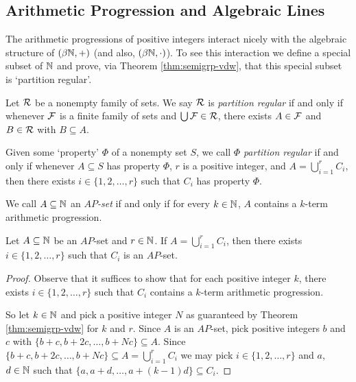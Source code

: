 \subsection{Arithmetic Progression and Algebraic Lines}
The arithmetic progressions of positive integers interact nicely with the algebraic structure of $(\beta \mathbb{N}, +)$ (and also, $(\beta \mathbb{N}, \cdot)$). 
To see this interaction we define a special subset of $\mathbb{N}$ and prove, via Theorem \ref{thm:semigrp-vdw}, that this special subset is `partition regular'.%

\begin{defn}
  Let $\mathcal{R}$ be a nonempty family of sets.
  We say $\mathcal{R}$ is \emph{partition regular} if and only if whenever $\mathcal{F}$ is a finite family of sets and $\bigcup \mathcal{F} \in \mathcal{R}$, there exists $A \in \mathcal{F}$ and $B \in \mathcal{R}$ with $B \subseteq A$.
\end{defn}
\begin{rmk}
  Given some `property' $\Phi$ of a nonempty set $S$, we call $\Phi$ \emph{partition regular} if and only if whenever $A \subseteq S$ has property $\Phi$, $r$ is a positive integer, and $A = \bigcup_{i=1}^r C_i$, then there exists $i \in \{1, 2, \ldots, r\}$ such that $C_i$ has property $\Phi$.
\end{rmk}

\begin{defn}
  We call $A \subseteq \mathbb{N}$ an \emph{$AP$-set} if and only if for every $k \in \mathbb{N}$, $A$ contains a $k$-term arithmetic progression.
\end{defn}

\begin{thm}
  \label{thm:ap-partition-reg}
  Let $A \subseteq \mathbb{N}$ be an $AP$-set and $r \in \mathbb{N}$.
  If $A = \bigcup_{i=1}^r C_i$, then there exists $i \in \{1, 2, \ldots, r\}$ such that $C_i$ is an $AP$-set.
\end{thm}
\begin{proof}
  Observe that it suffices to show that for each positive integer $k$, there exists $i \in \{1, 2, \ldots, r\}$ such that $C_i$ contains a $k$-term arithmetic progression.

  So let $k \in \mathbb{N}$ and pick a positive integer $N$ as guaranteed by Theorem \ref{thm:semigrp-vdw} for $k$ and $r$.
  Since $A$ is an $AP$-set, pick positive integers $b$ and $c$ with $\{b+c, b+2c, \ldots, b+Nc\} \subseteq A$. 
  Since $\{b+c, b+2c, \ldots, b+Nc \} \subseteq A = \bigcup_{i=1}^r C_i$ we may pick $i \in \{1, 2, \ldots, r\}$ and $a$, $d \in \mathbb{N}$ such that $\{a, a+d, \ldots, a+(k-1)d\} \subseteq C_i$.
\end{proof}

